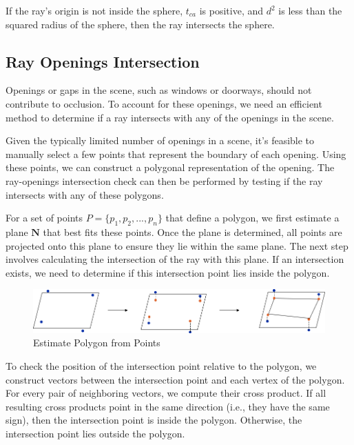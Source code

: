 \documentclass[11pt, a4paper,oneside,chapterprefix=false]{scrbook}
\begin{document}
If the ray's origin is not inside the sphere, \( t_{ca} \) is positive, and \( d^2 \) is less than the squared radius of the sphere, then the ray intersects the sphere.

\subsection{Ray Openings Intersection}

Openings or gaps in the scene, such as windows or doorways, should not contribute to occlusion. To account for these openings, we need an efficient method to determine if a ray intersects with any of the openings in the scene.

Given the typically limited number of openings in a scene, it's feasible to manually select a few points that represent the boundary of each opening. Using these points, we can construct a polygonal representation of the opening. The ray-openings intersection check can then be performed by testing if the ray intersects with any of these polygons.

For a set of points \( P = \{p_1, p_2, ..., p_n\} \) that define a polygon, we first estimate a plane \( \mathbf{N} \) that best fits these points. Once the plane is determined, all points are projected onto this plane to ensure they lie within the same plane. The next step involves calculating the intersection of the ray with this plane. If an intersection exists, we need to determine if this intersection point lies inside the polygon.

\begin{minipage}{\textwidth}
	\begin{figure}[H]
		\centering
		\includegraphics*[width=1.0\textwidth]{figures/detect openings.png}
		\caption{Estimate Polygon from Points}
		\label{fig:estimate polygon from points}
	\end{figure}
\end{minipage}

To check the position of the intersection point relative to the polygon, we construct vectors between the intersection point and each vertex of the polygon. For every pair of neighboring vectors, we compute their cross product. If all resulting cross products point in the same direction (i.e., they have the same sign), then the intersection point is inside the polygon. Otherwise, the intersection point lies outside the polygon.
\end{document}
